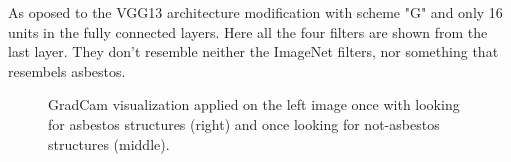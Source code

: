 \begin{figure}[H]
{}
\label{fig:vgg13_filter_activation}
\end{figure}

As oposed to the VGG13 architecture modification with scheme "G" and only 16 units in the fully connected layers. Here all the four filters are shown from the last layer. They don't resemble neither the ImageNet filters, nor something that resembels asbestos.

\begin{figure}[H]
\centering
\caption{GradCam visualization applied on the left image once with looking for asbestos structures (right) and once looking for not-asbestos structures (middle).}
\label{fig:asbestos_gradcam}
\end{figure}


